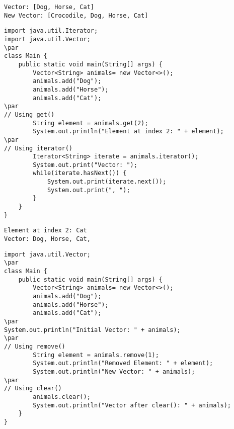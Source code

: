 \documentclass{book}
\def\lthtmlcheckvsize{\ifdim\ht\sizebox<\vsize 
  \ifdim\wd\sizebox<\hsize\expandafter\hfill\fi \expandafter\vfill
  \else\expandafter\vss\fi}%
\begin{document}
{\newpage\clearpage
{}%
\begin{lstlisting}
Vector: [Dog, Horse, Cat]
New Vector: [Crocodile, Dog, Horse, Cat]
\end{lstlisting}%
\lthtmlfigureZ
\lthtmlcheckvsize\clearpage}

{\newpage\clearpage
{}%
\begin{lstlisting}
import java.util.Iterator;
import java.util.Vector;
\par
class Main {
    public static void main(String[] args) {
        Vector<String> animals= new Vector<>();
        animals.add("Dog");
        animals.add("Horse");
        animals.add("Cat");
\par
// Using get()
        String element = animals.get(2);
        System.out.println("Element at index 2: " + element);
\par
// Using iterator()
        Iterator<String> iterate = animals.iterator();
        System.out.print("Vector: ");
        while(iterate.hasNext()) {
            System.out.print(iterate.next());
            System.out.print(", ");
        }
    }
}
\end{lstlisting}%
\lthtmlfigureZ
\lthtmlcheckvsize\clearpage}

{\newpage\clearpage
{}%
\begin{lstlisting}
Element at index 2: Cat
Vector: Dog, Horse, Cat,
\end{lstlisting}%
\lthtmlfigureZ
\lthtmlcheckvsize\clearpage}

{\newpage\clearpage
{}%
\begin{lstlisting}
import java.util.Vector;
\par
class Main {
    public static void main(String[] args) {
        Vector<String> animals= new Vector<>();
        animals.add("Dog");
        animals.add("Horse");
        animals.add("Cat");
\par
System.out.println("Initial Vector: " + animals);
\par
// Using remove()
        String element = animals.remove(1);
        System.out.println("Removed Element: " + element);
        System.out.println("New Vector: " + animals);
\par
// Using clear()
        animals.clear();
        System.out.println("Vector after clear(): " + animals);
    }
}
\end{lstlisting}%
\lthtmlfigureZ
\lthtmlcheckvsize\clearpage}
\end{document}
